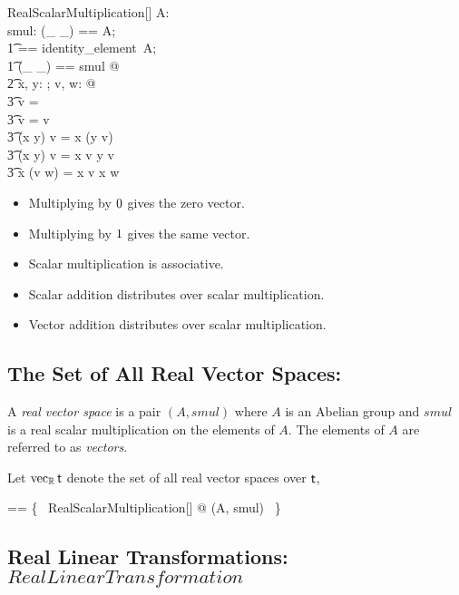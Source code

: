 \documentclass[11pt, oneside]{article}
\begin{document}
\begin{schema}{RealScalarMultiplication}[\genT]
A: \abgroup \genT \\
smul: \R \cross \genT \fun \genT
\where
\LET (\_ \addV \_) == A; \\
\t1	\zeroV == identity\_element~A; \\
\t1	(\_ \mulS \_) == smul @ \\
\t2		\forall x, y: \R; v, w: \genT @ \\
\t3			\zeroR \mulS v = \zeroV \land \\
\t3			\oneR \mulS v = v \land \\
\t3			(x \mulR y) \mulS v = x \mulS (y \mulS v) \land \\
\t3			(x \addR y) \mulS v = x \mulS v \addV y \mulS v \land \\
\t3			x \mulS (v \addV w) = x \mulS v \addV x \mulS w
\end{schema}

\begin{itemize}
	\item Multiplying by $0$ gives the zero vector.
	\item Multiplying by $1$ gives the same vector.
	\item Scalar multiplication is associative.
	\item Scalar addition distributes over scalar multiplication.
	\item Vector addition distributes over scalar multiplication.
\end{itemize}

\subsection{The Set of All Real Vector Spaces: }

A {\em real vector space} is a pair $(A, smul)$ where $A$ is an Abelian group and $smul$
is a real scalar multiplication on the elements of $A$.
The elements of $A$ are referred to as \textit{vectors}.

Let $\operatorname{vec_{\mathbb{R}}} \mathsf{t}$ denote the set of all real vector spaces over $\mathsf{t}$,

\begin{zed}
\vecR \genT == \{~ RealScalarMultiplication[\genT] @ (A, smul) ~\}
\end{zed}

\subsection{Real Linear Transformations: $RealLinearTransformation$}
\end{document}
